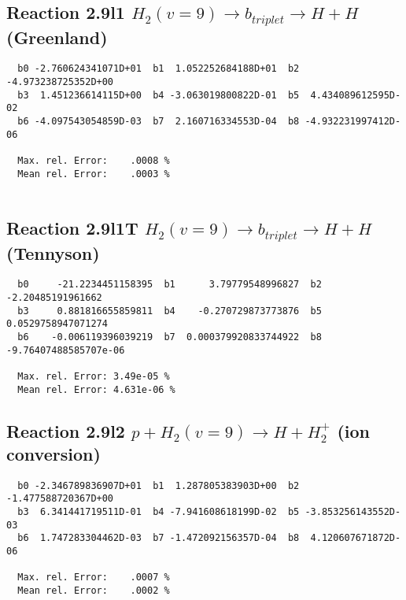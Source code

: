 \documentclass[12pt]{article}
\begin{document}
\newpage
\subsection{
Reaction 2.9l1
$ H_2(v=9) \rightarrow b_{triplet}\rightarrow H + H $ (Greenland) 
}


\begin{small}\begin{verbatim}
  b0 -2.760624341071D+01  b1  1.052252684188D+01  b2 -4.973238725352D+00
  b3  1.451236614115D+00  b4 -3.063019800822D-01  b5  4.434089612595D-02
  b6 -4.097543054859D-03  b7  2.160716334553D-04  b8 -4.932231997412D-06

  Max. rel. Error:    .0008 %
  Mean rel. Error:    .0003 %


\end{verbatim}\end{small}


\subsection{
Reaction 2.9l1T
$  H_2(v=9) \rightarrow b_{triplet}\rightarrow H + H $ (Tennyson)
}


\begin{small}\begin{verbatim}
  b0     -21.2234451158395  b1      3.79779548996827  b2     -2.20485191961662
  b3     0.881816655859811  b4    -0.270729873773876  b5    0.0529758947071274
  b6    -0.006119396039219  b7  0.000379920833744922  b8 -9.76407488585707e-06

  Max. rel. Error: 3.49e-05 %
  Mean rel. Error: 4.631e-06 %
\end{verbatim}\end{small}


\subsection{
Reaction 2.9l2
$ p + H_2(v=9) \rightarrow H + H_2^+$ (ion conversion)
}


\begin{small}\begin{verbatim}
  b0 -2.346789836907D+01  b1  1.287805383903D+00  b2 -1.477588720367D+00
  b3  6.341441719511D-01  b4 -7.941608618199D-02  b5 -3.853256143552D-03
  b6  1.747283304462D-03  b7 -1.472092156357D-04  b8  4.120607671872D-06

  Max. rel. Error:    .0007 %
  Mean rel. Error:    .0002 %


\end{verbatim}\end{small}
\end{document}
